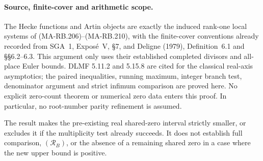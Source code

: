 \paragraph{Source, finite-cover and arithmetic scope.}
The Hecke functions and Artin objects are exactly the induced
rank-one local systems of (MA-RB.206)--(MA-RB.210), with the
finite-cover conventions already recorded from SGA~1,
Expos\'e~V, \S7, and Deligne (1979), Definition~6.1 and
\S\S6.2--6.3. This argument only uses their established
completed divisors and all-place Euler bounds. DLMF 5.11.2
and 5.15.8 are cited for the classical real-axis asymptotics;
the paired inequalities, running maximum, integer branch
test, denominator argument and strict infimum comparison
are proved here. No explicit zero-count theorem or numerical
zero data enters this proof. In particular, no root-number
parity refinement is assumed.

The result makes the pre-existing real shared-zero interval
strictly smaller, or excludes it if the multiplicity test
already succeeds. It does not establish full comparison,
\((\mathcal R_B)\), or the absence of a remaining shared
zero in a case where the new upper bound is positive.
